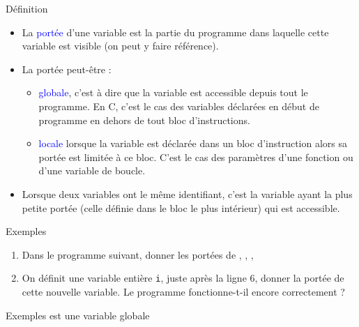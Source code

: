 \documentclass[10pt]{beamer}
\begin{document}
\begin{frame}{\Ctitle}{\stitle}
	\begin{alertblock}{Définition}
		\begin{itemize}
			\item<1-> La \textcolor{blue}{portée} d'une variable est la partie du programme  dans laquelle cette variable est visible (on peut y faire référence).
			\item<2-> La portée peut-être :
				\begin{itemize}
					\item<3-> \textcolor{blue}{globale}, c'est à dire que la variable est accessible depuis tout le programme. En C, c'est le cas des variables déclarées en début de programme en dehors de tout bloc d'instructions.
					\item<4-> \textcolor{blue}{locale} lorsque la variable est déclarée dans un bloc d'instruction alors sa portée est limitée à ce bloc. C'est le cas des paramètres d'une fonction ou d'une variable de boucle.
				\end{itemize}
			\item<5-> Lorsque deux variables ont le même identifiant, c'est la variable ayant la plus petite portée (celle définie dans le bloc le plus intérieur) qui est accessible.
		\end{itemize}
	\end{alertblock}
\end{frame}

\begin{frame}[fragile]{\Ctitle}{\stitle}
	\begin{exampleblock}{Exemples}
		\begin{enumerate}
		\item<1->Dans le programme suivant, donner les portées de , , , 
		\item<2-> On définit une variable entière {\tt i}, juste après la ligne 6, donner la portée de cette nouvelle variable. Le programme fonctionne-t-il encore correctement ?
		\end{enumerate}
	\end{exampleblock}
\end{frame}

\begin{frame}[fragile]{\Ctitle}{\stitle}
	\begin{exampleblock}{Exemples}
		 est une variable globale
	\end{exampleblock}
\end{frame}
\end{document}
